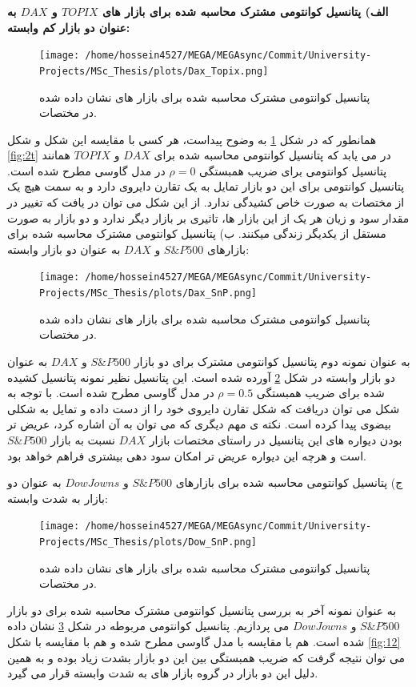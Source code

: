 \documentclass[a4paper,titlepage,12pt,fleqn,oneside]{report}
\begin{document}
	\textbf{
		الف) پتانسیل کوانتومی مشترک محاسبه شده برای بازار های 
		$TOPIX$
		و 
		$DAX$
		به عنوان دو بازار کم وابسته:
	}
	
	
	\begin{figure}[ptb]
		\centering
		\texttt{[image: /home/hossein4527/MEGA/MEGAsync/Commit/University-Projects/MSc\_Thesis/plots/Dax\_Topix.png]}
		\caption{پتانسیل کوانتومی مشترک محاسبه شده برای بازار های نشان داده شده در مختصات.}
		\label{fig:13}
	\end{figure}
	همانطور که در شکل
	\ref{fig:13}
	به وضوح پیداست، هر کسی با مقایسه این شکل و شکل 
	\ref{fig:2t}
	در می یابد که پتانسیل کوانتومی محاسبه شده برای 
	$DAX$
	و
	$TOPIX$
	همانند پتانسیل کوانتومی برای ضریب همبستگی 
	$\rho=0$
	در مدل گاوسی مطرح شده است. پتانسیل کوانتومی برای این دو بازار تمایل به یک تقارن دایروی دارد و به سمت هیچ یک از مختصات به صورت خاص کشیدگی ندارد. از این شکل می توان در یافت که تغییر در مقدار سود و زیان هر یک از این بازار ها، تاثیری بر بازار دیگر ندارد و دو بازار به صورت مستقل از یکدیگر زندگی میکنند.
	\newline
	\newline
	ب) پتانسیل کوانتومی مشترک محاسبه شده برای بازارهای 
	$S\&P500$
	و
	$DAX$
	به عنوان دو بازار وابسته:
	\begin{figure}[ptb]
		\centering
		\texttt{[image: /home/hossein4527/MEGA/MEGAsync/Commit/University-Projects/MSc\_Thesis/plots/Dax\_SnP.png]}
		\caption{پتانسیل کوانتومی مشترک محاسبه شده برای بازار های نشان داده شده در مختصات.}
		\label{fig:14}
	\end{figure}
	به عنوان نمونه دوم پتانسیل کوانتومی مشترک برای دو بازار 
	$S\&P500$
	و
	$DAX$
	به عنوان دو بازار وابسته در شکل
	\ref{fig:14}
	آورده شده است.
	این پتانسیل نظیر نمونه پتانسیل کشیده شده برای ضریب همبستگی
	$\rho=0.5$
	در مدل گاوسی مطرح شده است.
	با توجه به شکل می توان دریافت که شکل تقارن دایروی خود را از دست داده و تمایل به شکلی بیضوی پیدا کرده است. 
	نکته ی مهم دیگری که می توان به آن اشاره کرد، عریض تر بودن دیواره های این پتانسیل در راستای مختصات بازار 
	$DAX$
	نسبت به بازار 
	$S\&P500$
	است و هرچه این دیواره عریض تر امکان سود دهی بیشتری فراهم خواهد بود. 
	
	ج) پتانسیل کوانتومی محاسبه شده برای بازارهای 
	$S\&P500$
	و
	$Dow Jowns$
	به عنوان دو بازار به شدت وابسته:
	
	\begin{figure}[ptb]
		\centering
		\texttt{[image: /home/hossein4527/MEGA/MEGAsync/Commit/University-Projects/MSc\_Thesis/plots/Dow\_SnP.png]}
		\caption{پتانسیل کوانتومی مشترک محاسبه شده برای بازار های نشان داده شده در مختصات.}
		\label{fig:15}
	\end{figure}
	به عنوان نمونه آخر به بررسی پتانسیل کوانتومی مشترک محاسبه شده برای دو بازار 
	$S\&P500$
	و
	$Dow Jowns$
	می پردازیم. پتانسیل کوانتومی مربوطه در شکل
	\ref{fig:15}
	نشان داده شده است. هم با مقایسه با مدل گاوسی مطرح شده و هم با مقایسه با شکل
	\ref{fig:12}
	می توان نتیجه گرفت که ضریب همبستگی بین این دو بازار بشدت زیاد بوده و به همین دلیل این دو بازار در گروه بازار های به شدت وابسته قرار می گیرد.
	
\end{document}

